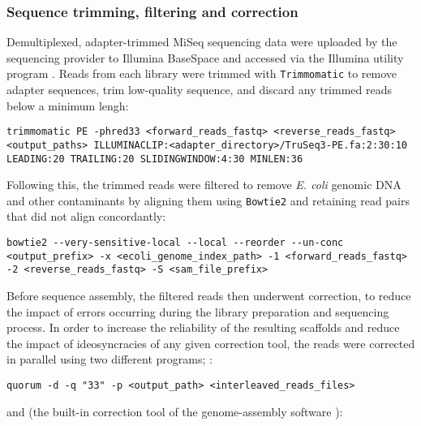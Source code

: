 \subsubsection{Sequence trimming, filtering and correction}
\label{sec:methods_comp_bacs_trim}

Demultiplexed, adapter-trimmed MiSeq sequencing data were uploaded by the sequencing provider to Illumina BaseSpace and accessed via the Illumina utility program . Reads from each library were trimmed with \lstinline{Trimmomatic} \parencite{bolger2014trimmomatic} to remove adapter sequences, trim low-quality sequence, and discard any trimmed reads below a minimum lengh:

\begin{lstlisting}
trimmomatic PE -phred33 <forward_reads_fastq> <reverse_reads_fastq> <output_paths> ILLUMINACLIP:<adapter_directory>/TruSeq3-PE.fa:2:30:10 LEADING:20 TRAILING:20 SLIDINGWINDOW:4:30 MINLEN:36
\end{lstlisting}

\noindent Following this, the trimmed reads were filtered to remove \textit{E. coli} genomic DNA and other contaminants by aligning them using \lstinline{Bowtie2} \parencite{langmead2012bowtie2} and retaining read pairs that did not align concordantly:

\begin{lstlisting}
bowtie2 --very-sensitive-local --local --reorder --un-conc <output_prefix> -x <ecoli_genome_index_path> -1 <forward_reads_fastq> -2 <reverse_reads_fastq> -S <sam_file_prefix>
\end{lstlisting}

\noindent Before sequence assembly, the filtered reads then underwent correction, to reduce the impact of errors occurring during the library preparation and sequencing process. In order to increase the reliability of the resulting scaffolds and reduce the impact of ideosyncracies of any given correction tool, the reads were corrected in parallel using two different programs;  \parencite{marcais2015quorum}:

\begin{lstlisting}
quorum -d -q "33" -p <output_path> <interleaved_reads_files>
\end{lstlisting}

\noindent and  (the built-in correction tool of the  genome-assembly software \parencite{bankevich2012spades,nikolenko2013bayeshammer}):

